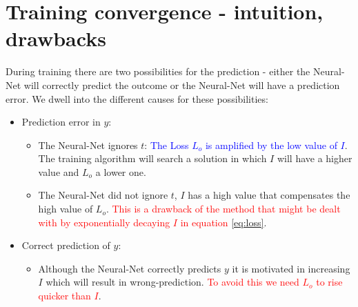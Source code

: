 \documentclass[oneside,12pt]{article}
\begin{document}
\section*{Training convergence - intuition, drawbacks}\label{sec:intuition}
During training there are two possibilities for the prediction - either the Neural-Net will correctly predict the outcome or the Neural-Net will have a prediction error. We dwell into the different causes for these possibilities: 
\begin{itemize}
    \item Prediction error in $y$:
    \begin{itemize}
        \item The Neural-Net ignores $t$: \textcolor{blue}{The Loss $L_o$ is amplified by the low value of $I$}. The training algorithm will search a solution in which $I$ will have a higher value and $L_o$ a lower one. 
        \item The Neural-Net did not ignore $t$, $I$ has a high value that compensates the high value of $L_o$. {\textcolor{red}{This is a drawback of the method that might be dealt with by exponentially decaying $I$ in equation \ref{eq:loss}}}.
    \end{itemize}
    \item Correct prediction of $y$:
    \begin{itemize}
        \item Although the Neural-Net correctly predicts $y$ it is motivated in increasing $I$ which will result in wrong-prediction. \textcolor{red}{To avoid this we need $L_o$ to rise quicker than $I$}.
    \end{itemize}
\end{itemize}
%
\end{document}
